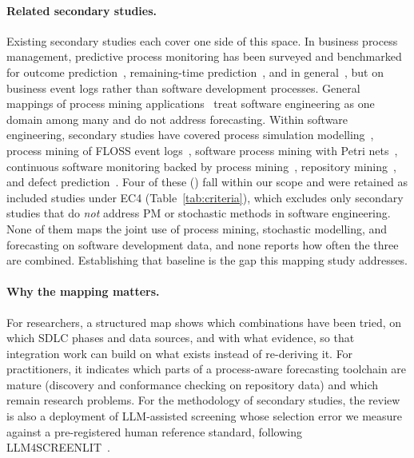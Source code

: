 \paragraph{Related secondary studies.} Existing secondary studies each cover
one side of this space. In business process management, predictive process
monitoring has been surveyed and benchmarked for outcome
prediction~\cite{teinemaa2019outcome}, remaining-time
prediction~\cite{verenich2019remaining}, and in
general~\cite{marquezchamorro2018predictive}, but on business event logs
rather than software development processes. General mappings of process
mining applications~\cite{garcia2019pmmapping,thiede2018pmorg} treat software
engineering as one domain among many and do not address forecasting. Within
software engineering, secondary studies have covered process simulation
modelling~\cite{zhang2010simulation,ali2014simulation}, process mining of
FLOSS event logs~\cite{mukala2015floss}, software process mining with Petri
nets~\cite{thamizharasan2016petri}, continuous software monitoring backed by
process mining~\cite{stepanov2026continuous}, repository
mining~\cite{kagdi2007msr}, and defect prediction~\cite{hall2012fault}. Four
of these (\cite{zhang2010simulation,mukala2015floss,thamizharasan2016petri,stepanov2026continuous})
fall within our scope and were retained as included studies under EC4
(Table~\ref{tab:criteria}), which excludes only secondary studies that do
\emph{not} address PM or stochastic methods in software engineering. None of
them maps the joint use of process mining, stochastic modelling, and
forecasting on software development data, and none reports how often the
three are combined. Establishing that baseline is the gap this mapping study
addresses.

\paragraph{Why the mapping matters.} For researchers, a structured map shows
which combinations have been tried, on which SDLC phases and data sources,
and with what evidence, so that integration work can build on what exists
instead of re-deriving it. For practitioners, it indicates which parts of a
process-aware forecasting toolchain are mature (discovery and conformance
checking on repository data) and which remain research problems. For the
methodology of secondary studies, the review is also a deployment of
LLM-assisted screening whose selection error we measure against a
pre-registered human reference standard, following
LLM4SCREENLIT~\cite{llm4screenlit2025}.

